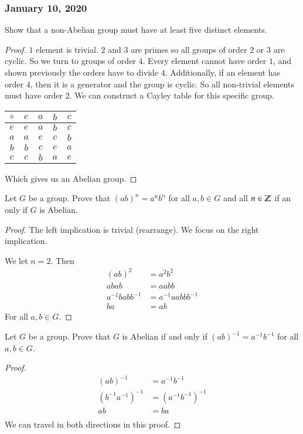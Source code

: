 \subsubsection*{January 10, 2020}

 Show that a non-Abelian group must have at least five distinct elements. 
\begin{proof}
$1$ element is trivial. $2$ and $3$ are primes so all groups of order $2$ or $3$ are cyclic. So we turn to groups of order $4$. Every element cannot have order $1$, and shown previously the orders have to divide $4$. Additionally, if an element has order $4$, then it is a generator and the group is cyclic. So all non-trivial elements must have order $2$. We can construct a Cayley table for this specific group. 

\begin{center}
\begin{tabular}{c|cccc}
$\circ$ & $e$ & $a$ & $b$ & $c$ \\ \hline
$e$     & $e$ & $a$ & $b$ & $c$ \\
$a$     & $a$ & $e$ & $c$ & $b$ \\
$b$     & $b$ & $c$ & $e$ & $a$ \\
$c$     & $c$ & $b$ & $a$ & $e$
\end{tabular}	
\end{center}
Which gives us an Abelian group. 
\end{proof}

 Let $G$ be a group. Prove that $(ab)^n=a^nb^n$ for all $a, b\in G$ and all $n\in \mathbb{Z}$ if an only if $G$ is Abelian. 
\begin{proof}
The left implication is trivial (rearrange). We focus on the right implication. 

We let $n=2$. Then
\begin{align*}
(ab)^2 &= a^2b^2\\
abab &= aabb \\
a^{-1}babb^{-1} &= a^{-1}aabbb^{-1} \\
ba &= ab
\end{align*}
For all $a,b\in G$. 
\end{proof}

 Let $G$ be a group. Prove that $G$ is Abelian if and only if $(ab)^{-1}=a^{-1}b^{-1}$ for all $a,b\in G$. 
\begin{proof}
\begin{align*}
	(ab)^{-1}&=a^{-1}b^{-1} \\
	(b^{-1}a^{-1})^{-1} &= (a^{-1}b^{-1})^{-1} \\
	ab &= ba \\
\end{align*}
We can travel in both directions in this proof. 
\end{proof}

